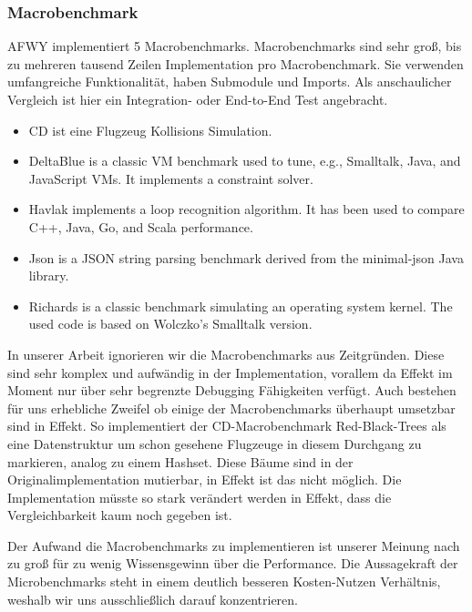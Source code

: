 \subsubsection{Macrobenchmark}
AFWY implementiert 5 Macrobenchmarks. 
Macrobenchmarks sind sehr groß, bis zu mehreren tausend Zeilen Implementation pro Macrobenchmark. Sie verwenden umfangreiche Funktionalität, haben Submodule und Imports. Als anschaulicher Vergleich ist hier ein Integration- oder End-to-End Test angebracht.

\begin{itemize}
\item CD ist eine Flugzeug Kollisions Simulation. 
\item DeltaBlue is a classic VM benchmark used to tune, e.g., Smalltalk, Java, and JavaScript VMs. It implements a constraint solver.
\item Havlak implements a loop recognition algorithm. It has been used to compare C++, Java, Go, and Scala performance.
\item Json is a JSON string parsing benchmark derived from the minimal-json Java library.
\item Richards is a classic benchmark simulating an operating system kernel. The used code is based on Wolczko's Smalltalk version.
\end{itemize}\cite[readme.md]{awfyGithub}

In unserer Arbeit ignorieren wir die Macrobenchmarks aus Zeitgründen. Diese sind sehr komplex und aufwändig in der Implementation, vorallem da Effekt im Moment nur über sehr begrenzte Debugging Fähigkeiten verfügt. Auch bestehen für uns erhebliche Zweifel ob einige der Macrobenchmarks überhaupt umsetzbar sind in Effekt. So implementiert der CD-Macrobenchmark Red-Black-Trees als eine Datenstruktur um schon gesehene Flugzeuge in diesem Durchgang zu markieren, analog zu einem Hashset.\cite{awfyGithub}
Diese Bäume sind in der Originalimplementation mutierbar, in Effekt ist das nicht möglich. Die Implementation müsste so stark verändert werden in Effekt, dass die Vergleichbarkeit kaum noch gegeben ist.

Der Aufwand die Macrobenchmarks zu implementieren ist unserer Meinung nach zu groß für zu wenig Wissensgewinn über die Performance.
Die Aussagekraft der Microbenchmarks steht in einem deutlich besseren Kosten-Nutzen Verhältnis, weshalb wir uns ausschließlich darauf konzentrieren.

